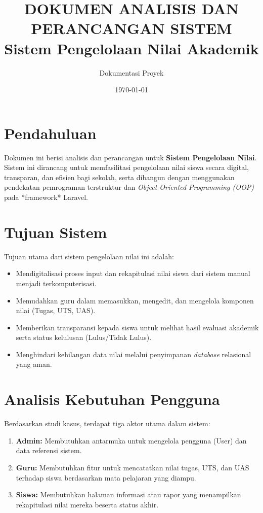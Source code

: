 \documentclass[12pt, a4paper]{article}
\title{\textbf{DOKUMEN ANALISIS DAN PERANCANGAN SISTEM\\ Sistem Pengelolaan Nilai Akademik}}
\author{Dokumentasi Proyek}
\date{\today}
\begin{document}
\maketitle
\tableofcontents
\newpage

\section{Pendahuluan}
Dokumen ini berisi analisis dan perancangan untuk \textbf{Sistem Pengelolaan Nilai}. Sistem ini dirancang untuk memfasilitasi pengelolaan nilai siswa secara digital, transparan, dan efisien bagi sekolah, serta dibangun dengan menggunakan pendekatan pemrograman terstruktur dan \textit{Object-Oriented Programming (OOP)} pada *framework* Laravel.

\section{Tujuan Sistem}
Tujuan utama dari sistem pengelolaan nilai ini adalah:
\begin{itemize}
    \item Mendigitalisasi proses input dan rekapitulasi nilai siswa dari sistem manual menjadi terkomputerisasi.
    \item Memudahkan guru dalam memasukkan, mengedit, dan mengelola komponen nilai (Tugas, UTS, UAS).
    \item Memberikan transparansi kepada siswa untuk melihat hasil evaluasi akademik serta status kelulusan (Lulus/Tidak Lulus).
    \item Menghindari kehilangan data nilai melalui penyimpanan \textit{database} relasional yang aman.
\end{itemize}

\section{Analisis Kebutuhan Pengguna}
Berdasarkan studi kasus, terdapat tiga aktor utama dalam sistem:
\begin{enumerate}
    \item \textbf{Admin:} Membutuhkan antarmuka untuk mengelola pengguna (User) dan data referensi sistem.
    \item \textbf{Guru:} Membutuhkan fitur untuk mencatatkan nilai tugas, UTS, dan UAS terhadap siswa berdasarkan mata pelajaran yang diampu.
    \item \textbf{Siswa:} Membutuhkan halaman informasi atau rapor yang menampilkan rekapitulasi nilai mereka beserta status akhir.
\end{enumerate}
\end{document}
